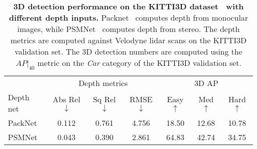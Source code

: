 
\begin{table}[t!]
\centering
{
\footnotesize
\setlength{\tabcolsep}{0.5em}
\begin{tabular}{l|ccc|ccc}
\toprule
& \multicolumn{3}{c}{Depth metrics} & \multicolumn{3}{c}{3D AP} \\ 
\multirow{-2}{*}{Depth net} & 
Abs Rel$\downarrow$ &
Sq Rel$\downarrow$ &
RMSE$\downarrow$&
Easy$\uparrow$ & Med$\uparrow$ & Hard$\uparrow$ \vspace{0.5mm}\\
\midrule
PackNet~\cite{guizilini20203d}  & 
0.112 & 
0.761 &  
4.756 &  
18.50 &  
12.68 &  
10.78 \\
PSMNet~\cite{chang2018pyramid} & 
0.043 & 
0.390 &  
2.861 &  
64.83 &  
42.74 &  
34.75\\

\bottomrule
\end{tabular}\\\vspace{0mm}
\caption{
\textbf{3D detection performance on the KITTI3D dataset~\cite{geiger2012we} with different depth inputs.} Packnet~\cite{guizilini20203d} computes depth from monocular images, while PSMNet~\cite{chang2018pyramid} computes depth from stereo. The depth metrics are computed against Velodyne lidar scans on the KITTI3D validation set. The 3D detection numbers are computed using the $AP|_{40}$ metric on the \textit{Car} category of the KITTI3D validation set.}
\label{table:baseline_depth_detection}
}
\end{table}